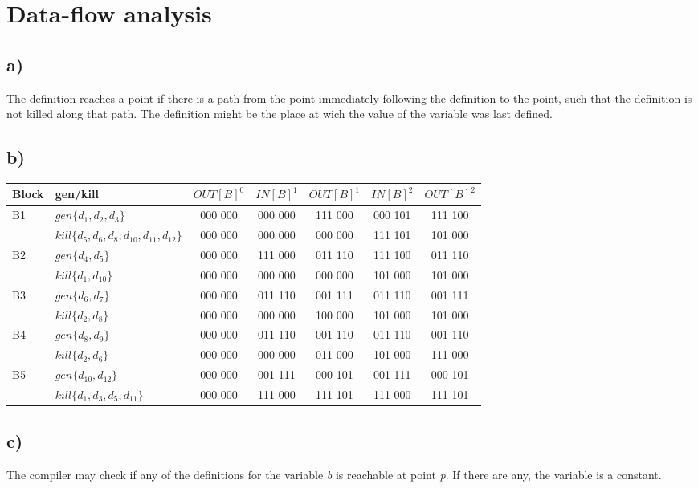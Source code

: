 \section{Data-flow analysis}
\subsection*{a)}
The definition reaches a point if there is a path from the point immediately following the definition to the point, such that the definition is not killed along that path. The definition might be the place at wich the value of the variable was last defined.
\subsection*{b)}
\begin{tabular}{|l|l|c c c c c |}
\hline
Block	&	gen/kill & $OUT[B]^0$ & $IN[B]^1$ & $OUT[B]^1$ & $IN[B]^2$ & $OUT[B]^2$	\\
\hline										%
\hline							
\multirow{2}{*}{B1} 	& $gen\{d_1, d_2, d_3\}$ 				& 000 000 & 000 000 & 111 000 & 000 101 & 111 100  	\\
			& $kill\{d_5, d_6, d_8, d_{10}, d_{11}, d_{12}\}$  	& 000 000 & 000 000 & 000 000 & 111 101 & 101 000 	\\
\hline	
\multirow{2}{*}{B2} 	& $gen\{d_4, d_5\}$	 				& 000 000 & 111 000 & 011 110 & 111 100 & 011 110  	\\
			& $kill\{d_1, d_{10} \}$  				& 000 000 & 000 000 & 000 000 & 101 000 & 101 000 	\\
\hline
\multirow{2}{*}{B3} 	& $gen\{d_6, d_7\}$					& 000 000 & 011 110 & 001 111 & 011 110 & 001 111  	\\
			& $kill\{d_2, d_8 \}$					& 000 000 & 000 000 & 100 000 & 101 000 & 101 000 	\\
\hline
\multirow{2}{*}{B4} 	& $gen\{d_8, d_9\}$					& 000 000 & 011 110 & 001 110 & 011 110 & 001 110  	\\
			& $kill\{d_2, d_6\}$					& 000 000 & 000 000 & 011 000 & 101 000 & 111 000 	\\
\hline
\multirow{2}{*}{B5} 	& $gen\{d_{10}, d_{12}\}$				& 000 000 & 001 111 & 000 101 & 001 111 & 000 101  	\\
			& $kill\{d_1, d_3, d_5, d_{11}\}$			& 000 000 & 111 000 & 111 101 & 111 000 & 111 101 	\\
\hline
\end{tabular}


\subsection{c)}
The compiler may check if any of the definitions for the variable \emph{b} is reachable at point \emph{p}. If there are any, the variable is a constant. 
